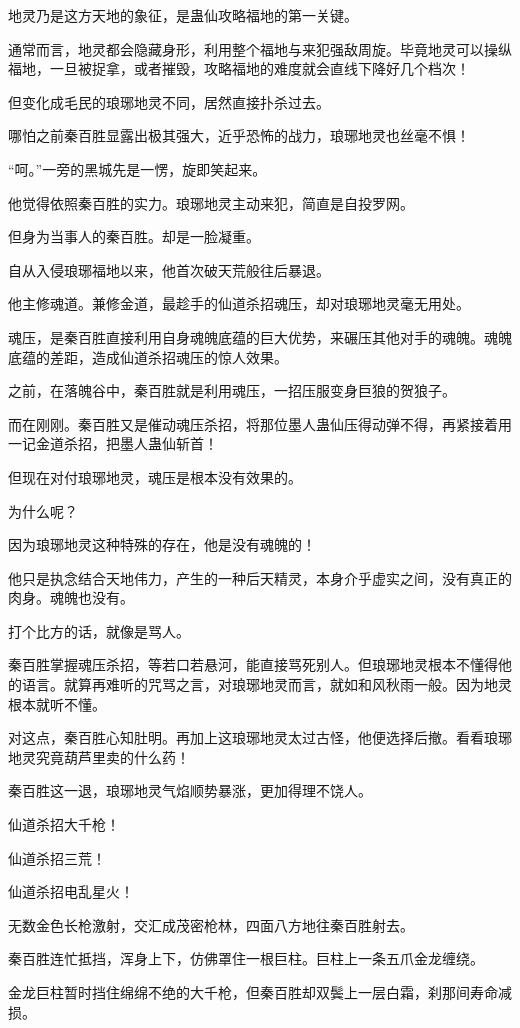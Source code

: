\begin{this_body}
地灵乃是这方天地的象征，是蛊仙攻略福地的第一关键。

通常而言，地灵都会隐藏身形，利用整个福地与来犯强敌周旋。毕竟地灵可以操纵福地，一旦被捉拿，或者摧毁，攻略福地的难度就会直线下降好几个档次！

但变化成毛民的琅琊地灵不同，居然直接扑杀过去。

哪怕之前秦百胜显露出极其强大，近乎恐怖的战力，琅琊地灵也丝毫不惧！

“呵。”一旁的黑城先是一愣，旋即笑起来。

他觉得依照秦百胜的实力。琅琊地灵主动来犯，简直是自投罗网。

但身为当事人的秦百胜。却是一脸凝重。

自从入侵琅琊福地以来，他首次破天荒般往后暴退。

他主修魂道。兼修金道，最趁手的仙道杀招魂压，却对琅琊地灵毫无用处。

魂压，是秦百胜直接利用自身魂魄底蕴的巨大优势，来碾压其他对手的魂魄。魂魄底蕴的差距，造成仙道杀招魂压的惊人效果。

之前，在落魄谷中，秦百胜就是利用魂压，一招压服变身巨狼的贺狼子。

而在刚刚。秦百胜又是催动魂压杀招，将那位墨人蛊仙压得动弹不得，再紧接着用一记金道杀招，把墨人蛊仙斩首！

但现在对付琅琊地灵，魂压是根本没有效果的。

为什么呢？

因为琅琊地灵这种特殊的存在，他是没有魂魄的！

他只是执念结合天地伟力，产生的一种后天精灵，本身介乎虚实之间，没有真正的肉身。魂魄也没有。

打个比方的话，就像是骂人。

秦百胜掌握魂压杀招，等若口若悬河，能直接骂死别人。但琅琊地灵根本不懂得他的语言。就算再难听的咒骂之言，对琅琊地灵而言，就如和风秋雨一般。因为地灵根本就听不懂。

对这点，秦百胜心知肚明。再加上这琅琊地灵太过古怪，他便选择后撤。看看琅琊地灵究竟葫芦里卖的什么药！

秦百胜这一退，琅琊地灵气焰顺势暴涨，更加得理不饶人。

仙道杀招大千枪！

仙道杀招三荒！

仙道杀招电乱星火！

无数金色长枪激射，交汇成茂密枪林，四面八方地往秦百胜射去。

秦百胜连忙抵挡，浑身上下，仿佛罩住一根巨柱。巨柱上一条五爪金龙缠绕。

金龙巨柱暂时挡住绵绵不绝的大千枪，但秦百胜却双鬓上一层白霜，刹那间寿命减损。


\end{this_body}
